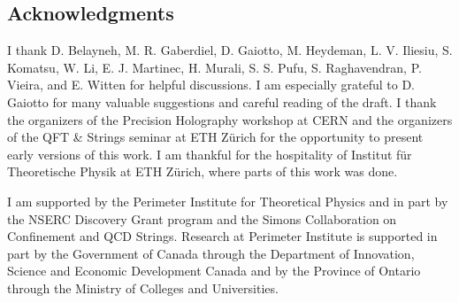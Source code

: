 \documentclass[a4paper,12pt]{article}
\begin{document}
\subsection*{Acknowledgments}

I thank D. Belayneh, M. R. Gaberdiel, D. Gaiotto, M. Heydeman, L. V. Iliesiu, S. Komatsu, W. Li, E. J. Martinec, H. Murali, S. S. Pufu, S. Raghavendran, P. Vieira, and E. Witten for helpful discussions. I am especially grateful to D. Gaiotto for many valuable suggestions and careful reading of the draft. I thank the organizers of the Precision Holography workshop at CERN and the organizers of the QFT \& Strings seminar at ETH Z\"{u}rich for the opportunity to present early versions of this work. I am thankful for the hospitality of Institut f\"{u}r Theoretische Physik at ETH Z\"{u}rich, where parts of this work was done.

I am supported by the Perimeter Institute for Theoretical Physics and in part by the NSERC Discovery Grant program and the Simons Collaboration on Confinement and QCD Strings. Research at Perimeter Institute is supported in part by the Government of Canada through the Department of Innovation, Science and Economic Development Canada and by the Province of Ontario through the Ministry of Colleges and Universities. 




\end{document}
